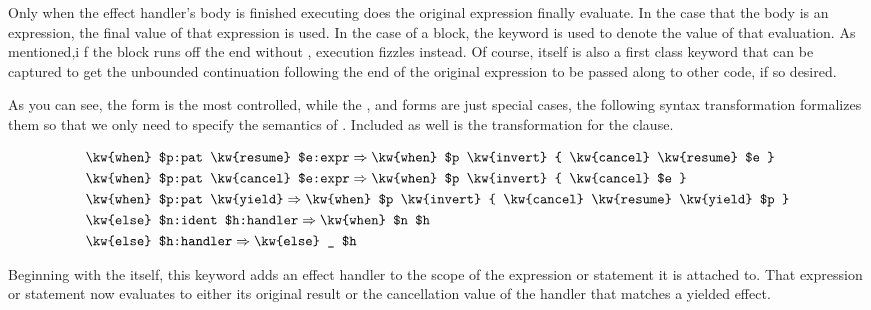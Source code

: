 Only when the effect handler's body is finished executing does the original
expression finally evaluate. In the case that the body is an expression, the
final value of that expression is used. In the case of a block, the 
keyword is used to denote the value of that evaluation. As mentioned,i f the block runs off
the end without , execution fizzles instead. Of course,  itself
is also a first class keyword that can be captured to get the unbounded continuation
following the end of the original expression to be passed along to other code, if
so desired.

As you can see, the  form is the most controlled, while the , 
and  forms are just special cases, the following syntax transformation
formalizes them so that we only need to specify the semantics of .
Included as well is the transformation for the  clause.

\begin{align*}
    & \texttt{\kw{when} \$p:pat \kw{resume} \$e:expr} \Rightarrow \texttt{\kw{when} \$p \kw{invert} \{ \kw{cancel} \kw{resume} \$e \}} \\ %
    & \texttt{\kw{when} \$p:pat \kw{cancel} \$e:expr} \Rightarrow \texttt{\kw{when} \$p \kw{invert} \{ \kw{cancel} \$e \}} \\ %
    & \texttt{\kw{when} \$p:pat \kw{yield}} \Rightarrow \texttt{\kw{when} \$p \kw{invert} \{ \kw{cancel} \kw{resume} \kw{yield} \$p \}} \\ %
    & \texttt{\kw{else} \$n:ident \$h:handler} \Rightarrow \texttt{\kw{when} \$n \$h} \\ %
    & \texttt{\kw{else} \$h:handler} \Rightarrow \texttt{\kw{else} \_ \$h} \\ %
\end{align*}

Beginning with the  itself, this keyword adds an effect handler to the scope
of the expression or statement it is attached to. That expression or statement now
evaluates to either its original result or the cancellation value of the handler that
matches a yielded effect.

\begin{prooftree}
\end{prooftree}


